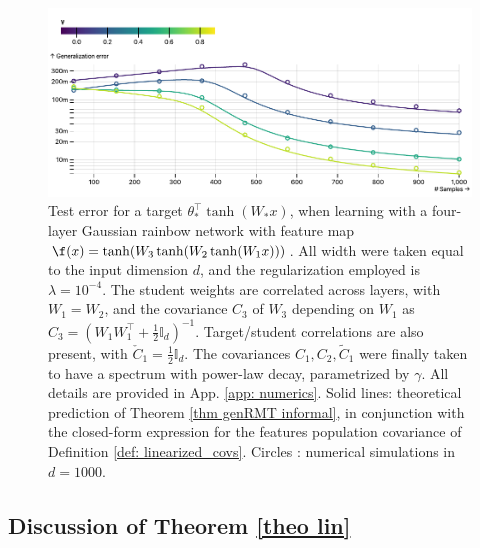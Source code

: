     
\begin{figure}[t]
    \centering
    \includegraphics[scale=0.6]{chapters/deeprf/figs/rf_emp.pdf}
    \caption{Test error for a target $\theta_*^\top \tanh(W_* x)$, when learning with a four-layer Gaussian rainbow network with feature map $\f(x)=\tanh(W_3\tanh(W_2\tanh(W_1x)))$. 
    All width were taken equal to the input dimension $d$, and the regularization employed is $\lambda=10^{-4}$. 
    The student weights are correlated across layers, with $W_1=W_2$, and the covariance $C_3$ of $W_3$ depending on $W_1$ as $C_3=(W_1W_1^\top+\frac{1}{2}\mathbb{I}_d)^{-1}$. 
    Target/student correlations are also present, with $\check{C}_1=\frac{1}{2}\mathbb{I}_d$. 
    The covariances $C_1,C_2,\tilde{C}_1$ were finally taken to have a spectrum with power-law decay, parametrized by $\gamma$. 
    All details are provided in App. \ref{app: numerics}. 
    Solid lines: theoretical prediction of Theorem \ref{thm genRMT informal}, in conjunction with the closed-form expression for the features population covariance of Definition \ref{def: linearized_covs}. 
    Circles : numerical simulations in $d=1000$. 
    }
    \label{fig:PL}
\end{figure}



\subsection{Discussion of Theorem \ref{theo lin}}

